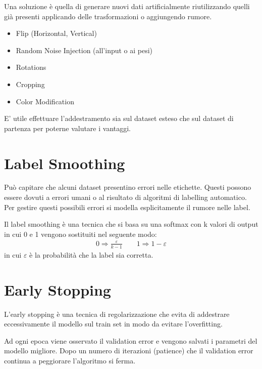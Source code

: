 Una soluzione è quella di generare nuovi dati artificialmente riutilizzando quelli già presenti applicando delle trasformazioni o aggiungendo rumore.

\begin{itemize}
  \item Flip (Horizontal, Vertical)
  \item Random Noise Injection (all'input o ai pesi)
  \item Rotations
  \item Cropping
  \item Color Modification
\end{itemize}

E' utile effettuare l'addestramento sia sul dataset esteso che sul dataset di partenza per poterne valutare i vantaggi.

\section{Label Smoothing}
Può capitare che alcuni dataset presentino errori nelle etichette. Questi possono essere dovuti a errori umani o al risultato di
algoritmi di labelling automatico. Per gestire questi possibili errori si modella esplicitamente il rumore nelle label.

Il label smoothing è una tecnica che si basa su una softmax con k valori di output in cui 0 e 1 vengono sostituiti nel seguente modo:
\begin{align*}
  0 \Rightarrow \frac{\varepsilon}{k - 1} \qquad 1 \Rightarrow 1 - \varepsilon
\end{align*}
in cui $\varepsilon$ è la probabilità che la label sia corretta.

\section{Early Stopping}
L'early stopping è una tecnica di regolarizzazione che evita di addestrare eccessivamente il modello sul train set in modo da evitare l'overfitting.

Ad ogni epoca viene osservato il validation error e vengono salvati i parametri del modello migliore.
Dopo un numero di iterazioni (patience) che il validation error continua a peggiorare l'algoritmo si ferma.

